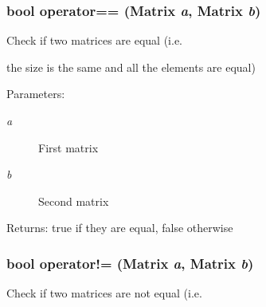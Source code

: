 \hypertarget{classgrassmann_1_1Matrix_f90a77a60d74b87ece26c07d2dc544ef}{
\subsubsection[operator==]{\setlength{\rightskip}{0pt plus 5cm}bool operator== ({\bf Matrix} {\em a}, \/  {\bf Matrix} {\em b})}}
\label{classgrassmann_1_1Matrix_f90a77a60d74b87ece26c07d2dc544ef}


Check if two matrices are equal (i.e. 

the size is the same and all the elements are equal) \begin{Desc}
\item[Parameters:]
\begin{description}
\item[{\em a}]First matrix \item[{\em b}]Second matrix \end{description}
\end{Desc}
\begin{Desc}
\item[Returns:]true if they are equal, false otherwise \end{Desc}
\hypertarget{classgrassmann_1_1Matrix_8cbc99e34ef59ed0adefd4f425705724}{
\subsubsection[operator"!=]{\setlength{\rightskip}{0pt plus 5cm}bool operator!= ({\bf Matrix} {\em a}, \/  {\bf Matrix} {\em b})}}
\label{classgrassmann_1_1Matrix_8cbc99e34ef59ed0adefd4f425705724}


Check if two matrices are not equal (i.e. 


